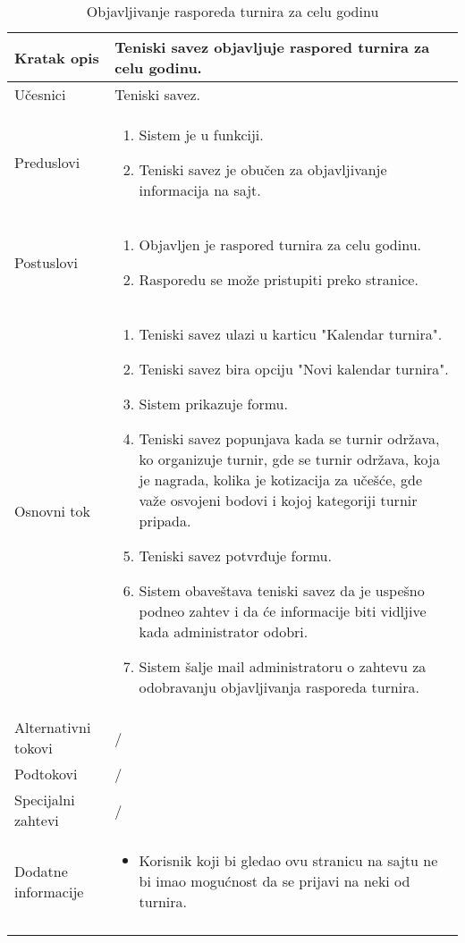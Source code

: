 \documentclass{article}
\begin{document}
    \begin{longtable}{| p{} | p{} |} 
        \hline
            Kratak opis & Teniski savez objavljuje raspored turnira za celu godinu.\\ 
        \hline    
            Učesnici & Teniski savez.\\
        \hline
            Preduslovi & 
                \begin{enumerate}
                    \item Sistem je u funkciji.
                    \item Teniski savez je obučen za objavljivanje informacija na sajt.
                \end{enumerate}\\
        \hline  
            Postuslovi & 
                \begin{enumerate}
                    \item Objavljen je raspored turnira za celu godinu.
                    \item Rasporedu se može pristupiti preko stranice.
                \end{enumerate}\\
        \hline
            Osnovni tok & 
                \begin{enumerate}
                    \item Teniski savez ulazi u karticu "Kalendar turnira".
                    \item Teniski savez bira opciju "Novi kalendar turnira".
                    \item Sistem prikazuje formu.
                    \item Teniski savez popunjava kada se turnir održava, ko organizuje turnir, gde se turnir održava, koja je nagrada, kolika je kotizacija za učešće, gde važe osvojeni bodovi i kojoj kategoriji turnir pripada. 
                    \item Teniski savez potvrđuje formu.
                    \item Sistem obaveštava teniski savez da je uspešno podneo zahtev i da će informacije biti vidljive kada administrator odobri.
                    \item Sistem šalje mail administratoru o zahtevu za odobravanju objavljivanja rasporeda turnira.
                \end{enumerate}\\
        \hline
            Alternativni tokovi & /\\
        \hline
            Podtokovi & /\\
        \hline
            Specijalni zahtevi & /\\
        \hline
            Dodatne informacije & 
                \begin{itemize}
                    \item Korisnik koji bi gledao ovu stranicu na sajtu ne bi imao mogućnost da se prijavi na neki od turnira.
                \end{itemize}\\
        \hline 
        \caption{Objavljivanje rasporeda turnira za celu godinu}
    \end{longtable}
\end{document}
